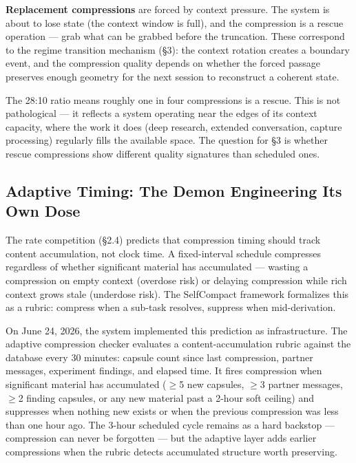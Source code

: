 \documentclass[12pt]{article}
\begin{document}
\textbf{Replacement compressions} are forced by context pressure. The system is about to lose state (the context window is full), and the compression is a rescue operation --- grab what can be grabbed before the truncation. These correspond to the regime transition mechanism (\S3): the context rotation creates a boundary event, and the compression quality depends on whether the forced passage preserves enough geometry for the next session to reconstruct a coherent state.

The 28:10 ratio means roughly one in four compressions is a rescue. This is not pathological --- it reflects a system operating near the edges of its context capacity, where the work it does (deep research, extended conversation, capture processing) regularly fills the available space. The question for \S3 is whether rescue compressions show different quality signatures than scheduled ones.

\subsection{Adaptive Timing: The Demon Engineering Its Own Dose}

The rate competition (\S2.4) predicts that compression timing should track content accumulation, not clock time. A fixed-interval schedule compresses regardless of whether significant material has accumulated --- wasting a compression on empty context (overdose risk) or delaying compression while rich context grows stale (underdose risk). The SelfCompact framework \citep{li2026} formalizes this as a rubric: compress when a sub-task resolves, suppress when mid-derivation.

On June 24, 2026, the system implemented this prediction as infrastructure. The adaptive compression checker evaluates a content-accumulation rubric against the database every 30 minutes: capsule count since last compression, partner messages, experiment findings, and elapsed time. It fires compression when significant material has accumulated ($\geq$5 new capsules, $\geq$3 partner messages, $\geq$2 finding capsules, or any new material past a 2-hour soft ceiling) and suppresses when nothing new exists or when the previous compression was less than one hour ago. The 3-hour scheduled cycle remains as a hard backstop --- compression can never be forgotten --- but the adaptive layer adds earlier compressions when the rubric detects accumulated structure worth preserving.
\end{document}
